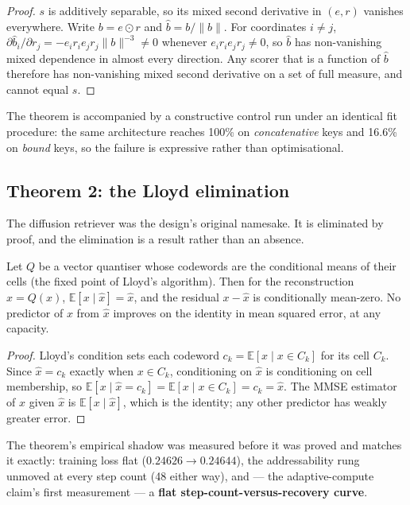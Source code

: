 \begin{proof}
$s$ is additively separable, so its mixed second derivative in $(e, r)$ vanishes everywhere. Write
$b = e \odot r$ and $\hat b = b / \lVert b \rVert$. For coordinates $i \neq j$,
$\partial \hat b_i / \partial r_j = -e_i r_i e_j r_j \lVert b \rVert^{-3} \neq 0$ whenever
$e_i r_i e_j r_j \neq 0$, so $\hat b$ has non-vanishing mixed dependence in almost every direction.
Any scorer that is a function of $\hat b$ therefore has non-vanishing mixed second derivative on a
set of full measure, and cannot equal $s$.
\end{proof}

\noindent The theorem is accompanied by a constructive control run under an identical fit procedure:
the same architecture reaches 100\% on \emph{concatenative} keys and 16.6\% on \emph{bound} keys, so
the failure is expressive rather than optimisational.

\subsection{Theorem 2: the Lloyd elimination}

The diffusion retriever was the design's original namesake. It is eliminated by proof, and the
elimination is a result rather than an absence.

\begin{theorem}
\label{thm:lloyd}
Let $Q$ be a vector quantiser whose codewords are the conditional means of their cells (the fixed
point of Lloyd's algorithm). Then for the reconstruction $\hat x = Q(x)$,
$\mathbb{E}[x \mid \hat x] = \hat x$, and the residual $x - \hat x$ is conditionally mean-zero. No
predictor of $x$ from $\hat x$ improves on the identity in mean squared error, at any capacity.
\end{theorem}

\begin{proof}
Lloyd's condition sets each codeword $c_k = \mathbb{E}[x \mid x \in C_k]$ for its cell $C_k$. Since
$\hat x = c_k$ exactly when $x \in C_k$, conditioning on $\hat x$ is conditioning on cell
membership, so $\mathbb{E}[x \mid \hat x = c_k] = \mathbb{E}[x \mid x \in C_k] = c_k = \hat x$. The
MMSE estimator of $x$ given $\hat x$ is $\mathbb{E}[x \mid \hat x]$, which is the identity; any other
predictor has weakly greater error.
\end{proof}

\noindent The theorem's empirical shadow was measured before it was proved and matches it exactly:
training loss flat ($0.24626 \to 0.24644$), the addressability rung unmoved at every step count
(48 either way), and --- the adaptive-compute claim's first measurement --- a
\textbf{flat step-count-versus-recovery curve}.

